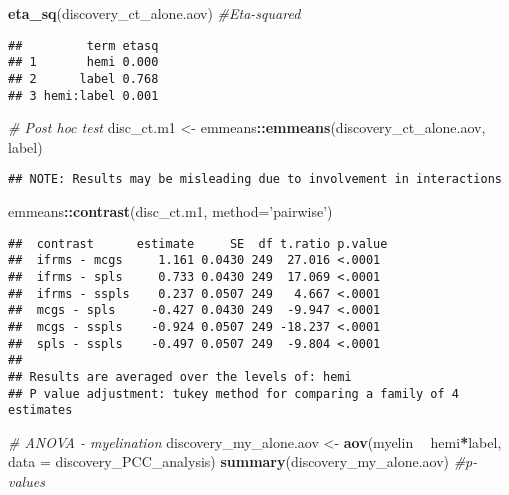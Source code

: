 \documentclass[
]{article}
\newenvironment{Shaded}{\begin{snugshade}}{\end{snugshade}}
\newcommand{\CommentTok}[1]{\textcolor[rgb]{0.56,0.35,0.01}{\textit{#1}}}
\newcommand{\DataTypeTok}[1]{\textcolor[rgb]{0.13,0.29,0.53}{#1}}
\newcommand{\KeywordTok}[1]{\textcolor[rgb]{0.13,0.29,0.53}{\textbf{#1}}}
\newcommand{\NormalTok}[1]{#1}
\newcommand{\OperatorTok}[1]{\textcolor[rgb]{0.81,0.36,0.00}{\textbf{#1}}}
\newcommand{\StringTok}[1]{\textcolor[rgb]{0.31,0.60,0.02}{#1}}
\begin{document}
\begin{Shaded}
\begin{Highlighting}[]
\KeywordTok{eta_sq}\NormalTok{(discovery_ct_alone.aov) }\CommentTok{#Eta-squared}
\end{Highlighting}
\end{Shaded}

\begin{verbatim}
##         term etasq
## 1       hemi 0.000
## 2      label 0.768
## 3 hemi:label 0.001
\end{verbatim}

\begin{Shaded}
\begin{Highlighting}[]
\CommentTok{# Post hoc test}
\NormalTok{disc_ct.m1 <-}\StringTok{ }\NormalTok{emmeans}\OperatorTok{::}\KeywordTok{emmeans}\NormalTok{(discovery_ct_alone.aov, }\OperatorTok{~}\StringTok{ }\NormalTok{label)}
\end{Highlighting}
\end{Shaded}

\begin{verbatim}
## NOTE: Results may be misleading due to involvement in interactions
\end{verbatim}

\begin{Shaded}
\begin{Highlighting}[]
\NormalTok{emmeans}\OperatorTok{::}\KeywordTok{contrast}\NormalTok{(disc_ct.m1, }\DataTypeTok{method=}\StringTok{'pairwise'}\NormalTok{)}
\end{Highlighting}
\end{Shaded}

\begin{verbatim}
##  contrast      estimate     SE  df t.ratio p.value
##  ifrms - mcgs     1.161 0.0430 249  27.016 <.0001 
##  ifrms - spls     0.733 0.0430 249  17.069 <.0001 
##  ifrms - sspls    0.237 0.0507 249   4.667 <.0001 
##  mcgs - spls     -0.427 0.0430 249  -9.947 <.0001 
##  mcgs - sspls    -0.924 0.0507 249 -18.237 <.0001 
##  spls - sspls    -0.497 0.0507 249  -9.804 <.0001 
## 
## Results are averaged over the levels of: hemi 
## P value adjustment: tukey method for comparing a family of 4 estimates
\end{verbatim}

\begin{Shaded}
\begin{Highlighting}[]
\CommentTok{# ANOVA - myelination}
\NormalTok{discovery_my_alone.aov <-}\StringTok{ }\KeywordTok{aov}\NormalTok{(myelin }\OperatorTok{~}\StringTok{ }\NormalTok{hemi}\OperatorTok{*}\NormalTok{label, }\DataTypeTok{data =}\NormalTok{ discovery_PCC_analysis)}
\KeywordTok{summary}\NormalTok{(discovery_my_alone.aov) }\CommentTok{#p-values}
\end{Highlighting}
\end{Shaded}
\end{document}
